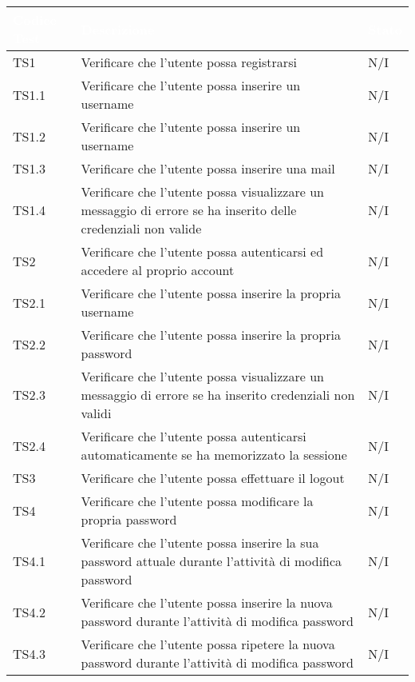 {
    \setlength{\freewidth}{\dimexpr\textwidth-10\tabcolsep}
    \renewcommand{\arraystretch}{1.5}
    \centering
    \setlength{\aboverulesep}{0pt}
    \setlength{\belowrulesep}{0pt}
    \begin{longtable}{C{.3\freewidth} C{.5\freewidth} C{.3\freewidth}}
       \toprule
    \textcolor{white}{\textbf{Codice Test}}&
    \textcolor{white}{\textbf{Descrizione}}&
    \textcolor{white}{\textbf{Stato}}\\	
    \toprule
    \endhead

    TS1 & Verificare che l'utente possa registrarsi & N/I  \\ 
    TS1.1 & Verificare che l'utente possa inserire un username & N/I  \\
    TS1.2 & Verificare che l'utente possa inserire un username & N/I  \\
    TS1.3 & Verificare che l'utente possa inserire una mail & N/I  \\
    TS1.4 & Verificare che l'utente possa visualizzare un messaggio di errore se ha inserito delle credenziali non valide & N/I  \\
    TS2 & Verificare che l'utente possa autenticarsi ed accedere al proprio account & N/I  \\
    TS2.1 & Verificare che l'utente possa inserire la propria username & N/I  \\
    TS2.2 & Verificare che l'utente possa inserire la propria password & N/I  \\
    TS2.3 & Verificare che l'utente possa visualizzare un messaggio di errore se ha inserito credenziali non validi & N/I  \\
    TS2.4 & Verificare che l'utente possa autenticarsi automaticamente se ha memorizzato la sessione  & N/I  \\
    TS3 & Verificare che l'utente possa effettuare il logout & N/I  \\
    TS4 & Verificare che l'utente possa modificare la propria password & N/I  \\
    TS4.1 & Verificare che l'utente possa inserire la sua password attuale durante l'attività di modifica password & N/I  \\
    TS4.2 & Verificare che l'utente possa inserire la nuova password durante l'attività di modifica password & N/I  \\
    TS4.3 & Verificare che l'utente possa ripetere la nuova password durante l'attività di modifica password & N/I  \\

\end{longtable}}
